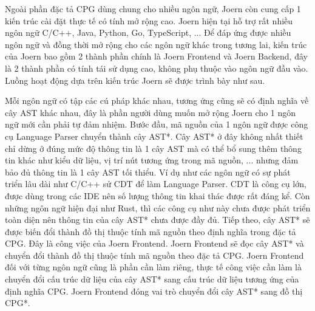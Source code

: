 Ngoài phần đặc tả CPG dùng chung cho nhiều ngôn ngữ, Joern còn cung cấp 1 kiến trúc cài đặt thực tế có tính mở rộng cao. Joern hiện tại hỗ trợ rất nhiều ngôn ngữ C/C++, Java, Python, Go, TypeScript, ... Để đáp ứng được nhiều ngôn ngữ và đồng thời mở rộng cho các ngôn ngữ khác trong tương lai, kiến trúc của Joern bao gồm 2 thành phần chính là Joern Frontend và Joern Backend, đây là 2 thành phần có tính tái sử dụng cao, không phụ thuộc vào ngôn ngữ đầu vào. Luồng hoạt động dựa trên kiến trúc Joern sẽ được trình bày như sau.

Mỗi ngôn ngữ có tập các cú pháp khác nhau, tương ứng cũng sẽ có định nghĩa về cây AST khác nhau, đây là phần người dùng muốn mở rộng Joern cho 1 ngôn ngữ mới cần phải tự đảm nhiệm. Bước đầu, mã nguồn của 1 ngôn ngữ được công cụ Language Parser chuyển thành cây AST*. Cây AST* ở đây không nhất thiết chỉ dừng ở đúng mức độ thông tin là 1 cây AST mà có thể bổ sung thêm thông tin khác như kiểu dữ liệu, vị trí nút tương ứng trong mã nguồn, ... nhưng đảm bảo đủ thông tin là 1 cây AST tối thiểu. Ví dụ như các ngôn ngữ có sự phát triển lâu dài như C/C++ sử CDT \cite{eclipseEclipseCC} để làm Language Parser. CDT là công cụ lớn, được dùng trong các IDE nên số lượng thông tin khai thác được rất đáng kể. Còn những ngôn ngữ hiện đại như Rust, thì các công cụ như này chưa được phát triển toàn diện nên thông tin của cây AST* chưa được đầy đủ.
Tiếp theo, cây AST* sẽ được biến đổi thành đồ thị thuộc tính mã nguồn theo định nghĩa trong đặc tả CPG. Đây là công việc của Joern Frontend. Joern Frontend sẽ đọc cây AST* và chuyển đổi thành đồ thị thuộc tính mã nguồn theo đặc tả CPG. Joern Frontend đối với từng ngôn ngữ cũng là phần cần làm riêng, thực tế công việc cần làm là chuyển đổi cấu trúc dữ liệu của cây AST* sang cấu trúc dữ liệu tương ứng của định nghĩa CPG. Joern Frontend đóng vai trò chuyển đổi cây AST* sang đồ thị CPG*.


